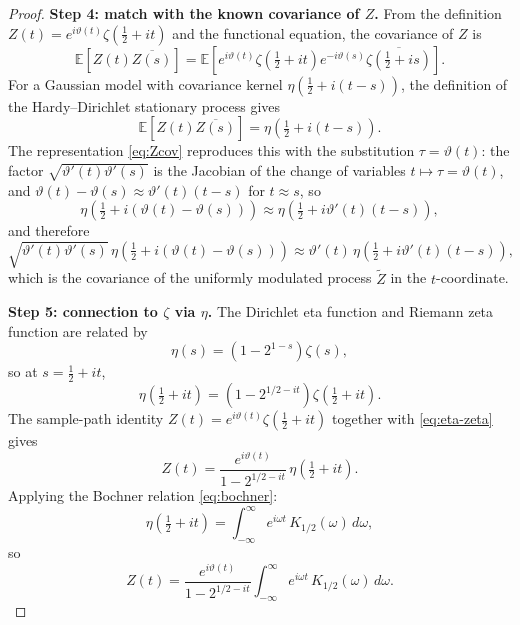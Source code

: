 \documentclass[11pt,a4paper]{article}
\begin{document}
\begin{proof}
\medskip\noindent\textbf{Step 4: match with the known covariance of $Z$.}
From the definition $Z(t)=e^{i\vartheta(t)}\zeta(\tfrac{1}{2}+it)$ and the
functional equation, the covariance of $Z$ is
\begin{equation}
  \label{eq:Zcov-known}
  \mathbb{E}[Z(t)\overline{Z(s)}]
  =\mathbb{E}\!\left[e^{i\vartheta(t)}\zeta\!\left(\tfrac{1}{2}+it\right)
                     e^{-i\vartheta(s)}\overline{\zeta\!\left(\tfrac{1}{2}+is\right)}\right].
\end{equation}
For a Gaussian model with covariance kernel
$\eta(\tfrac{1}{2}+i(t-s))$, the
definition of the Hardy--Dirichlet stationary process gives
\begin{equation}
  \mathbb{E}[Z(t)\overline{Z(s)}]=\eta\!\left(\tfrac{1}{2}+i(t-s)\right).
\end{equation}
The representation \eqref{eq:Zcov} reproduces this with the substitution
$\tau=\vartheta(t)$: the factor $\sqrt{\vartheta'(t)\vartheta'(s)}$ is the
Jacobian of the change of variables $t\mapsto\tau=\vartheta(t)$, and
$\vartheta(t)-\vartheta(s)\approx\vartheta'(t)(t-s)$ for $t\approx s$, so
\begin{equation}
  \eta\!\left(\tfrac{1}{2}+i(\vartheta(t)-\vartheta(s))\right)
  \approx
  \eta\!\left(\tfrac{1}{2}+i\vartheta'(t)(t-s)\right),
\end{equation}
and therefore
\begin{equation}
  \sqrt{\vartheta'(t)\vartheta'(s)}\,
  \eta\!\left(\tfrac{1}{2}+i(\vartheta(t)-\vartheta(s))\right)
  \approx
  \vartheta'(t)\,\eta\!\left(\tfrac{1}{2}+i\vartheta'(t)(t-s)\right),
\end{equation}
which is the covariance of the uniformly modulated process $\widetilde{Z}$
in the $t$-coordinate.

\medskip\noindent\textbf{Step 5: connection to $\zeta$ via $\eta$.}
The Dirichlet eta function and Riemann zeta function are related by
\begin{equation}
  \label{eq:eta-zeta}
  \eta(s)=(1-2^{1-s})\zeta(s),
\end{equation}
so at $s=\tfrac{1}{2}+it$,
\begin{equation}
  \eta\!\left(\tfrac{1}{2}+it\right)
  =\left(1-2^{1/2-it}\right)\zeta\!\left(\tfrac{1}{2}+it\right).
\end{equation}
The sample-path identity $Z(t)=e^{i\vartheta(t)}\zeta(\tfrac{1}{2}+it)$ together
with \eqref{eq:eta-zeta} gives
\begin{equation}
  \label{eq:Z-via-eta}
  Z(t)=\frac{e^{i\vartheta(t)}}{1-2^{1/2-it}}\,\eta\!\left(\tfrac{1}{2}+it\right).
\end{equation}
Applying the Bochner relation \eqref{eq:bochner}:
\begin{equation}
  \eta\!\left(\tfrac{1}{2}+it\right)
  =\int_{-\infty}^{\infty} e^{i\omega t}\,K_{1/2}(\omega)\,d\omega,
\end{equation}
so
\begin{equation}
  \label{eq:Z-integral}
  Z(t)=\frac{e^{i\vartheta(t)}}{1-2^{1/2-it}}
       \int_{-\infty}^{\infty} e^{i\omega t}\,K_{1/2}(\omega)\,d\omega.
\end{equation}


\end{proof}
\end{document}
